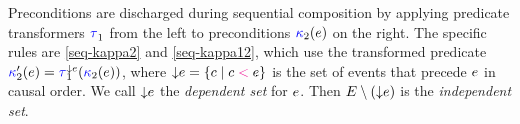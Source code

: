 

Preconditions are discharged during sequential composition by applying
predicate transformers $\aTr[1]{}{}$ from the left to preconditions
${\color{blue}\kappa}_2(e)$ on the right.  The specific rules are
\ref{seq-kappa2} and \ref{seq-kappa12}, which use the transformed predicate
$\labelingForm'_2(\aEv)=\aTr[1]{\Cdown{\aEv}}{\labelingForm_2(\aEv})$, where
$\smash{\downarrow}e=\{ c \mid c \mathrel{{\color{magenta}<}} e \}$ is the set of events that
precede $e$ in causal order.  We call $\smash{\downarrow}e$ the \emph{dependent
  set} for $e$.  Then $E\setminus(\smash{\downarrow}e)$ is the
\emph{independent set}. %




